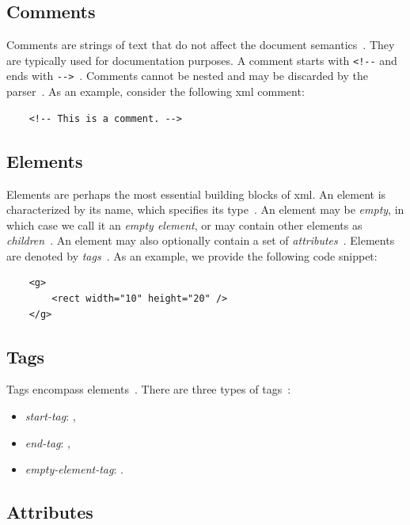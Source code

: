 \subsection{Comments}

Comments are strings of text that do not affect the document semantics~\cite[Sec.~2.5]{xml11}. They are typically used for documentation purposes. A comment starts with \texttt{<!-{}-} and ends with \texttt{-{}->}~\cite[Sec.~2.5]{xml11}. Comments cannot be nested and may be discarded by the parser~\cite[Sec.~2.5]{xml11}. As an example, consider the following \gls{xml} comment:
\begin{verbatim}
    <!-- This is a comment. -->
\end{verbatim}

\subsection{Elements}

Elements are perhaps the most essential building blocks of \gls{xml}. An element is characterized by its name, which specifies its type~\cite[Sec.~3]{xml11}. An element may be \emph{empty}, in which case we call it an \emph{empty element}, or may contain other elements as \emph{children}~\cite[Sec.~3]{xml11}. An element may also optionally contain a set of \emph{attributes}~\cite[Sec.~3]{xml11}. Elements are denoted by \emph{tags}~\cite[Sec.~3]{xml11}. As an example, we provide the following code snippet:
\begin{verbatim}
    <g>
        <rect width="10" height="20" />
    </g>
\end{verbatim}

\subsection{Tags}

\begin{samepage}
Tags encompass elements~\cite[Sec.~3]{xml11}. There are three types of tags~\cite[Sec.~3]{xml11}:
\begin{itemize}
    \item \emph{start-tag}: ,
    \item \emph{end-tag}: ,
    \item \emph{empty-element-tag}: .
\end{itemize}
\end{samepage}

\subsection{Attributes}

